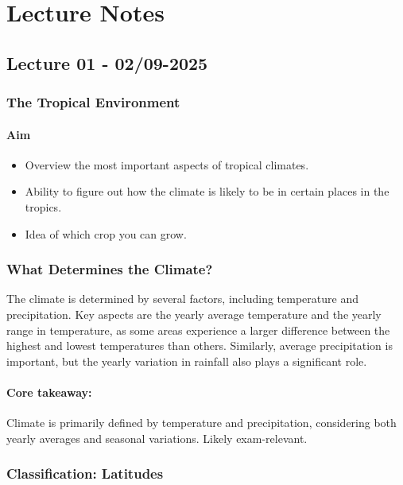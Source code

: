 \setcounter{chapter}{0}
\setcounter{section}{0}
\chapter{Lecture Notes}
\setlength{\headheight}{12.71342pt}
\addtolength{\topmargin}{-0.71342pt}

\section{Lecture 01 - 02/09-2025}
\subsection{The Tropical Environment} 

\subsubsection{Aim} 
\begin{itemize} 
    \item Overview the most important aspects of tropical climates. 
    \item Ability to figure out how the climate is likely to be in certain places in the tropics. 
    \item Idea of which crop you can grow. 
\end{itemize}

\subsection{What Determines the Climate?} 
The climate is determined by several factors, including temperature and precipitation. Key aspects are the yearly average temperature and the yearly range in temperature, as some areas experience a larger difference between the highest and lowest temperatures than others. Similarly, average precipitation is important, but the yearly variation in rainfall also plays a significant role.
\subsubsection*{Core takeaway:} 
Climate is primarily defined by temperature and precipitation, considering both yearly averages and seasonal variations. Likely exam-relevant.

\subsection{Classification: Latitudes} 

